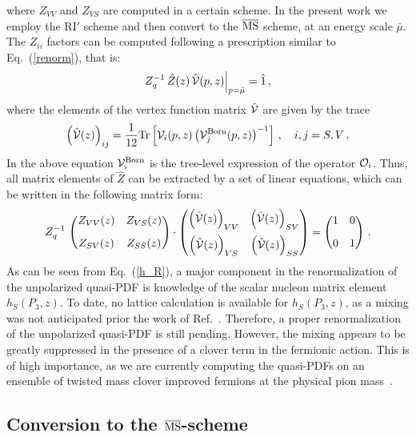 \documentclass[12pt,tighten,nofootinbib,amssymb,floatfix]{article}
\newcommand{\MSb}{{\overline{\rm MS}}}
\newcommand{\be}{\begin{equation}}
\newcommand{\ee}{\end{equation}}
\begin{document}
%
where $Z_{VV}$ and $Z_{VS}$ are computed in a certain scheme. In the present work
we employ the RI$'$ scheme and then convert to the $\MSb$ scheme, at an energy scale $\bar\mu$.
The $Z_{ii}$ factors can be computed following a prescription similar to Eq.~(\ref{renorm}), that is:
\be
\label{renormMIX}
Z_q^{-1}\,\hat{Z}(z)\, {\cal \hat{V}}(p,z)\Bigr|_{p=\bar\mu} = \hat{1}\,,
\ee
%
where the elements of the vertex function matrix ${\cal \hat{V}}$ are given by the trace
\be
\left({\cal \hat{V}}(z) \right)_{ij}=  \frac{1}{12} {\rm Tr} \left[{\cal V}_i(p,z) \left({\cal V}_j^{\rm Born}(p,z)\right)^{-1}\right]\,,\quad i,j=S,V\,.
\ee
In the above equation ${\cal V}_i^{\rm Born}$ is the tree-level expression of the operator ${\cal O}_i$.
Thus, all matrix elements of $\hat{Z}$ can be extracted by a set of linear equations, which can be written in 
the following matrix form:
\be
Z_q^{-1}\,\begin{pmatrix} Z_{VV}(z) & Z_{VS}(z) \\[2ex] Z_{SV}(z) & Z_{SS}(z) \end{pmatrix}  \cdot
\begin{pmatrix}  \left({\cal \hat{V}}(z) \right)_{VV} & \left({\cal \hat{V}}(z) \right)_{SV} \\[2ex]
 \left({\cal \hat{V}}(z) \right)_{VS} &\left({\cal \hat{V}}(z) \right)_{SS} \end{pmatrix} =
\begin{pmatrix} 1& 0 \\[2ex] 0 & 1\end{pmatrix} \,.
\ee
As can be seen from Eq.~(\ref{h_R}), a major component in the renormalization of 
the unpolarized quasi-PDF is knowledge of the scalar nucleon matrix element $h_S(P_3,z)$. To date, no lattice calculation
is available for $h_S(P_3,z)$, as a mixing was not anticipated prior the work of Ref.~\cite{Constantinou:2017sej}. Therefore,
a proper renormalization of the unpolarized quasi-PDF is still pending. However, the mixing appears to be greatly suppressed
in the presence of a clover term in the fermionic action. This is of high importance, as we are currently computing the quasi-PDFs on
an ensemble of twisted mass clover improved fermions at the physical pion mass~\cite{Abdel-Rehim:2015pwa,Abdel-Rehim:2015owa}.


\vspace*{0.25cm}
\subsection{Conversion to the $\MSb$-scheme}
\vspace*{0.15cm}
\end{document}
